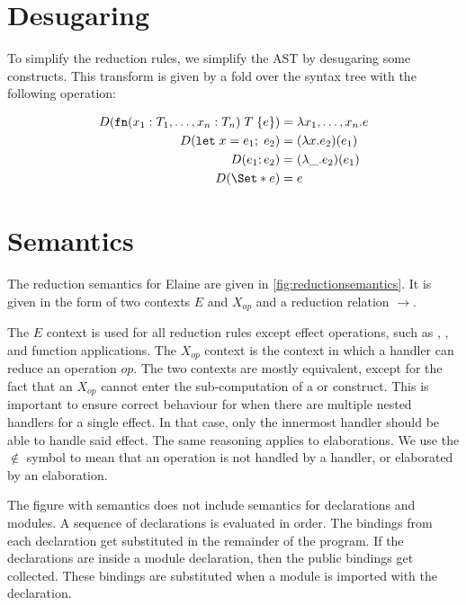 \section{Desugaring}
To simplify the reduction rules, we simplify the AST by desugaring some constructs. This transform is given by a fold over the syntax tree with the following operation:

\begin{align*}
    D(\fn(x_1: T_1, \dots, x_n: T_n)\;T\;\{e\}) &= \lambda x_1,\dots,x_n . e \\
    D(\kw{let}\;x = e_1;\;e_2) &= (\lambda x . e_2)(e_1)\\
    D(e_1; e_2) &= (\lambda \_ . e_2)(e_1)\\
    D(\S{e}) &= e\\
\end{align*}

\section{Semantics}\label{sec:semantics}
\newcommand{\reduce}{\quad\longrightarrow\quad}

The reduction semantics for Elaine are given in \cref{fig:reductionsemantics}. It is given in the form of two contexts $E$ and $X_{op}$ and a reduction relation $\longrightarrow$.

The $E$ context is used for all reduction rules except effect operations, such as , , and function applications. The $X_{op}$ context is the context in which a handler can reduce an operation $op$. The two contexts are mostly equivalent, except for the fact that an $X_{op}$ cannot enter the sub-computation of a  or  construct. This is important to ensure correct behaviour for when there are multiple nested handlers for a single effect. In that case, only the innermost handler should be able to handle said effect. The same reasoning applies to elaborations. We use the $\not\in$ symbol to mean that an operation is not handled by a handler, or elaborated by an elaboration.

The figure with semantics does not include semantics for declarations and modules. A sequence of declarations is evaluated in order. The bindings from each declaration get substituted in the remainder of the program. If the declarations are inside a module declaration, then the public bindings get collected. These bindings are substituted when a module is imported with the  declaration.


